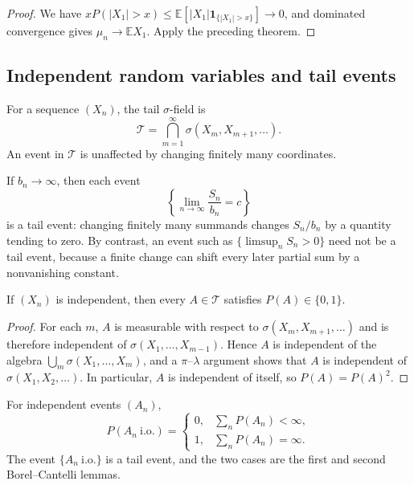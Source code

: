 \begin{proof}
We have
$xP(|X_1|>x)\leq\mathbb E[|X_1|\mathbf1_{\{|X_1|>x\}}]\to0$, and dominated
convergence gives
$\mu_n\to\mathbb E X_1$. Apply the preceding theorem.
\end{proof}

\subsection{Independent random variables and tail events}

\begin{de}
For a sequence $(X_n)$, the tail $\sigma$-field is
\[
\mathcal T=\bigcap_{m=1}^{\infty}\sigma(X_m,X_{m+1},\ldots).
\]
An event in $\mathcal T$ is unaffected by changing finitely many coordinates.
\end{de}

\begin{eg}
If $b_n\to\infty$, then each event
\[
\left\{\lim_{n\to\infty}\frac{S_n}{b_n}=c\right\}
\]
is a tail event: changing finitely many summands changes $S_n/b_n$ by a
quantity tending to zero. By contrast, an event such as
$\{\limsup_nS_n>0\}$ need not be a tail event, because a finite change can
shift every later partial sum by a nonvanishing constant.
\end{eg}

\begin{thm}
If $(X_n)$ is independent, then every $A\in\mathcal T$ satisfies
$P(A)\in\{0,1\}$.
\end{thm}

\begin{proof}
For each $m$, $A$ is measurable with respect to
$\sigma(X_m,X_{m+1},\ldots)$ and is therefore independent of
$\sigma(X_1,\ldots,X_{m-1})$. Hence $A$ is independent of the algebra
$\bigcup_m\sigma(X_1,\ldots,X_m)$, and a $\pi$--$\lambda$ argument shows that
$A$ is independent of $\sigma(X_1,X_2,\ldots)$. In particular, $A$ is
independent of itself, so $P(A)=P(A)^2$.
\end{proof}

\begin{eg}
For independent events $(A_n)$,
\[
P(A_n\ \mathrm{i.o.})=
\begin{cases}
0,&\sum_nP(A_n)<\infty,\\
1,&\sum_nP(A_n)=\infty.
\end{cases}
\]
The event $\{A_n\ \mathrm{i.o.}\}$ is a tail event, and the two cases are the
first and second Borel--Cantelli lemmas.
\end{eg}

